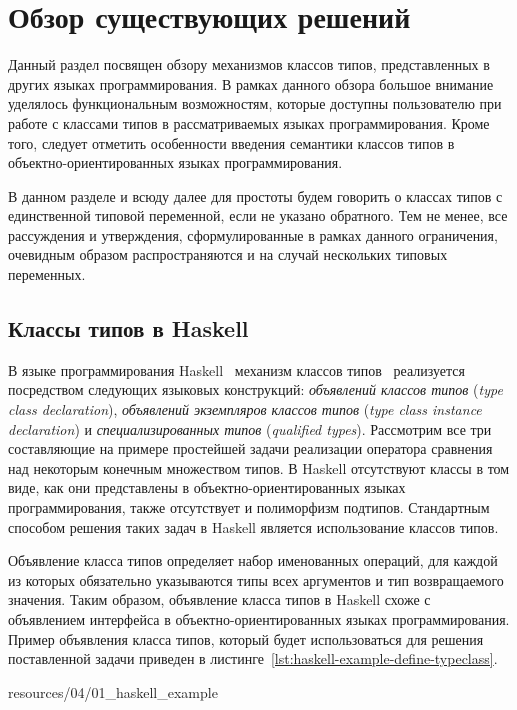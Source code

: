 \chapter{Обзор существующих решений}

Данный раздел посвящен обзору механизмов классов типов, представленных в других языках программирования. В рамках данного обзора большое внимание уделялось функциональным возможностям, которые доступны пользователю при работе с классами типов в рассматриваемых языках программирования. Кроме того, следует отметить особенности введения семантики классов типов в объектно-ориентированных языках программирования.

В данном разделе и всюду далее для простоты будем говорить о классах типов с единственной типовой переменной, если не указано обратного. Тем не менее, все рассуждения и утверждения, сформулированные в рамках данного ограничения, очевидным образом распространяются и на случай нескольких типовых переменных.

\section{Классы типов в Haskell \label{sct:overview-haskell}}

В языке программирования Haskell~\cite{haskell} механизм классов типов~\cite{WadlerB89, JonesJM97} реализуется посредством следующих языковых конструкций: \emph{объявлений классов типов} (\emph{type class declaration}), \emph{объявлений экземпляров классов типов} (\emph{type class instance declaration}) и \emph{специализированных типов} (\emph{qualified types}). Рассмотрим все три составляющие на примере простейшей задачи реализации оператора сравнения над некоторым конечным множеством типов. В Haskell отсутствуют классы в том виде, как они представлены в объектно-ориентированных языках программирования, также отсутствует и полиморфизм подтипов. Стандартным способом решения таких задач в Haskell является использование классов типов.

Объявление класса типов определяет набор именованных операций, для каждой из которых обязательно указываются типы всех аргументов и тип возвращаемого значения. Таким образом, объявление класса типов в Haskell схоже с объявлением интерфейса в объектно-ориентированных языках программирования. Пример объявления класса типов, который будет использоваться для решения поставленной задачи приведен в листинге~\ref{lst:haskell-example-define-typeclass}.    


{resources/04/01_haskell_example}

